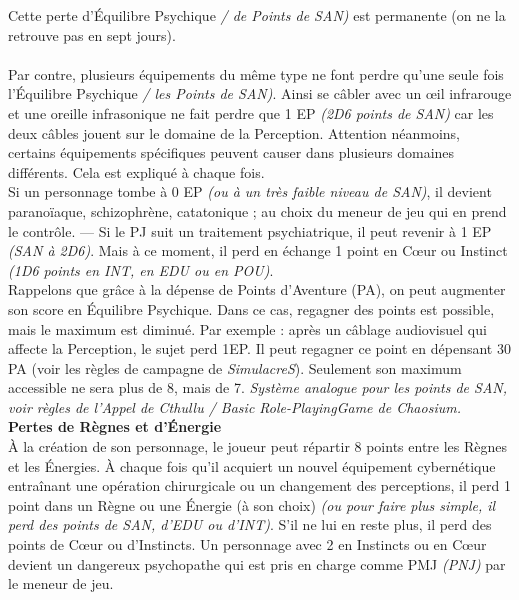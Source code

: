 \documentclass[11pt,twoside,a4paper]{article}
\begin{document}
\begin{multicols*}{2}
Cette perte d'{\'E}quilibre Psychique \emph{/ de Points de SAN)} est permanente (on ne la retrouve pas en sept jours). ~\\

\vfill ~\\

Par contre, plusieurs {\'e}quipements du m{\^e}me type ne font perdre qu'une seule fois l'{\'E}quilibre Psychique \emph{/ les Points de SAN)}. Ainsi se c{\^a}bler avec un \oe il infrarouge et une oreille infrasonique ne fait perdre que 1 EP \emph{(2D6 points de SAN)} car les deux c{\^a}bles jouent sur le domaine de la Perception. Attention n{\'e}anmoins, certains {\'e}quipements sp{\'e}cifiques peuvent causer dans plusieurs domaines diff{\'e}rents. Cela est expliqu{\'e} {\`a} chaque fois. ~\\
Si un personnage tombe {\`a} 0 EP \emph{(ou {\`a} un tr{\`e}s faible niveau de SAN)}, il devient parano{\"i}aque, schizophr{\`e}ne, catatonique ; au choix du meneur de jeu qui en prend le contr{\^o}le. --- Si le PJ suit un traitement psychiatrique, il peut revenir {\`a} 1 EP \emph{(SAN {\`a} 2D6)}. Mais {\`a} ce moment, il perd en {\'e}change 1 point en C\oe ur ou Instinct \emph{(1D6 points en INT, en EDU ou en POU)}. ~\\
Rappelons que gr{\^a}ce {\`a} la d{\'e}pense de Points d'Aventure (PA), on peut augmenter son score en {\'E}quilibre Psychique. Dans ce cas, regagner des points est possible, mais le maximum est diminu{\'e}. Par exemple : apr{\`e}s un c{\^a}blage audiovisuel qui affecte la Perception, le sujet perd 1EP. Il peut regagner ce point en d{\'e}pensant 30 PA (voir les r{\`e}gles de campagne de \emph{SimulacreS}). Seulement son maximum accessible ne sera plus de 8, mais de 7. \emph{Syst{\`e}me analogue pour les points de SAN, voir r{\`e}gles de l'\emph{Appel de Cthullu} / Basic Role-PlayingGame de \emph{Chaosium}. } ~\\

\textbf{Pertes de R{\`e}gnes et d'{\'E}nergie}~\\
{\`A} la cr{\'e}ation de son personnage, le joueur peut r{\'e}partir 8 points entre les R{\`e}gnes et les {\'E}nergies. {\`A} chaque fois qu'il acquiert un nouvel {\'e}quipement cybern{\'e}tique entra{\^i}nant une op{\'e}ration chirurgicale ou un changement des perceptions, il perd 1 point dans un R{\`e}gne ou une {\'E}nergie ({\`a} son choix) \emph{(ou pour faire plus simple, il perd des points de SAN, d'EDU ou d'INT)}. S'il ne lui en reste plus, il perd des points de C\oe ur ou d'Instincts. Un personnage avec 2 en Instincts ou en C\oe ur devient un dangereux psychopathe qui est pris en charge comme PMJ \emph{(PNJ)} par le meneur de jeu. ~\\


\end{multicols*}
\end{document}
